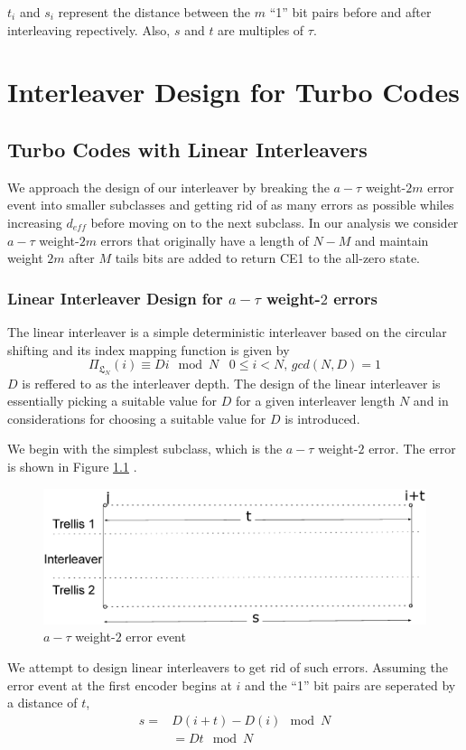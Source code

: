 \documentclass[a4paper, 12pt, oneside, openary]{jbook}
\begin{document}
 $t_i$ and $s_i$ represent the distance between the $m$ ``1'' bit pairs before and after interleaving repectively. Also, $s$ and $t$ are multiples of $\tau$.

 
\chapter{Interleaver Design for Turbo Codes}
\section{Turbo Codes with Linear Interleavers}

We approach the design of our interleaver by breaking the $a-\tau$ weight-$2m$ error event into smaller subclasses and getting rid of as many errors as possible whiles increasing $d_{eff}$ before moving on to the next subclass. In our analysis we consider 
$a-\tau$ weight-$2m$ errors that originally have a length of $N-M$ and maintain weight $2m$ after $M$ tails bits are added to return CE1 to the all-zero state.

 
 \subsection{Linear Interleaver Design for $a-\tau$ weight-$2$ errors}\label{ss2}
 The linear interleaver is a simple deterministic interleaver based on the circular shifting and its index mapping function is given by
$$ \Pi_{\mathfrak{L}_N}(i) \equiv Di \mod N \,\,\,\,\, 0 \leq i < N, \, gcd(N,D)=1$$
$D$ is reffered to as the interleaver depth. The design of the linear interleaver is essentially picking a suitable value for $D$ for a
given interleaver length $N$ and in \cite{ref2} considerations for choosing a suitable 
value for $D$ is introduced. 

 We begin with
the simplest subclass, which is the $a-\tau$ weight-$2$ error. The error is shown in Figure \ref{2_error} . 
\begin{figure}[h!]
\centering
\includegraphics[width=\textwidth]{weight2.eps}
\caption{$a-\tau$ weight-$2$ error event}
\label{2_error}
\end{figure}
We attempt to design linear interleavers to get rid of such errors.
Assuming the error event at the first encoder begins at $i$ and the ``1'' bit pairs are seperated by a distance of $t$, 
\begin{equation}
\begin{split}
s = &D(i+t) - D(i) \mod N\\
&= Dt \mod N
\end{split}
\label{distrel}
\end{equation}
\end{document}
